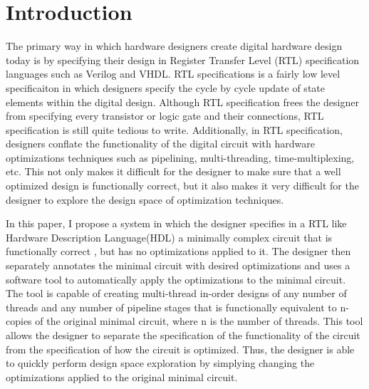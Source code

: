 \section{Introduction}
The primary way in which hardware designers create digital hardware design today is by specifying their design in Register Transfer Level (RTL) specification languages such as Verilog and VHDL. RTL specifications is a fairly low level specificaiton in which designers specify the cycle by cycle update of state elements within the digital design. Although RTL specification frees the designer from specifying every transistor or logic gate and their connections, RTL specification is still quite tedious to write. Additionally, in RTL specification, designers conflate the functionality of the digital circuit with hardware optimizations techniques such as pipelining, multi-threading, time-multiplexing, etc. This not only makes it difficult for the designer to make sure that a well optimized design is functionally correct, but it also makes it very difficult for the designer to explore the design space of optimization techniques.

In this paper, I propose a system in which the designer specifies in a RTL like Hardware Description Language(HDL) a minimally complex circuit that is functionally correct , but has no optimizations applied to it. The designer then separately annotates the minimal circuit with desired optimizations and uses a software tool to automatically apply the optimizations to the minimal circuit. The tool is capable of creating multi-thread in-order designs of any number of threads and any number of pipeline stages that is functionally equivalent to n-copies of the original minimal circuit, where n is the number of threads. This tool allows the designer to separate the specification of the functionality of the circuit from the specification of how the circuit is optimized. Thus, the designer is able to quickly perform design space exploration by simplying changing the optimizations applied to the original minimal circuit.


